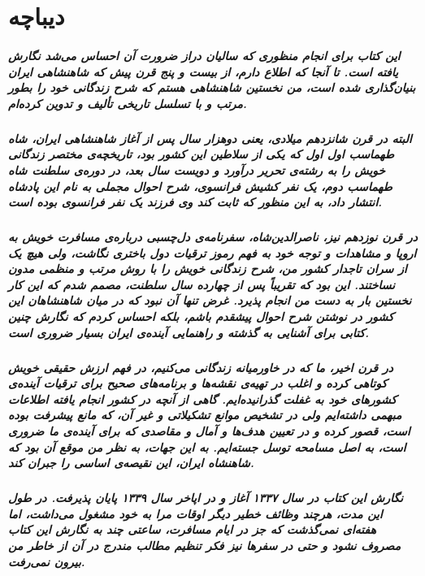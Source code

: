 \chapter{دیباچه}
\paragraph{
این کتاب برای انجام منظوری که سالیان دراز ضرورت آن احساس می‌شد نگارش یافته است. تا آنجا که اطلاع دارم، از بیست و پنج قرن پیش که شاهنشاهی ایران بنیان‌گذاری شده است، من نخستین شاهنشاهی هستم که شرح زندگانی خود را بطور مرتب و با تسلسل تاریخی تألیف و تدوین کرده‌ام.
}
\paragraph{
البته در قرن شانزدهم میلادی، یعنی دوهزار سال پس از آغاز شاهنشاهی ایران، \gls{شاه طهماسب اول} اول که یکی از سلاطین این کشور بود، تاریخچه‌‌ی مختصر زندگانی خویش را به رشته‌ی تحریر درآورد و دویست سال بعد، در دوره‌ی سلطنت \gls{شاه طهماسب دوم}، یک نفر کشیش فرانسوی، شرح احوال مجملی به نام این پادشاه انتشار داد، به این منظور که ثابت کند وی فرزند یک نفر فرانسوی بوده است. 
}
\paragraph{
در قرن نوزدهم نیز، \gls{ناصرالدین‌شاه}، سفرنامه‌ی دل‌چسبی درباره‌ی مسافرت خویش به اروپا و مشاهدات و توجه خود به فهم رموز ترقیات دول باختری نگاشت، ولی هیچ یک از سران تاجدار کشور من، شرح زندگانی خویش را با روش مرتب و منظمی مدون نساختند. این بود که تقریباً پس از چهارده سال سلطنت، مصمم شدم که این کار نخستین بار به دست من انجام پذیرد. 
غرض تنها آن نبود که در میان شاهنشاهان این کشور در نوشتن شرح احوال پیشقدم باشم، بلکه احساس کردم که نگارش چنین کتابی برای آشنایی به گذشته و راهنمایی آینده‌ی ایران بسیار ضروری است.
}
\paragraph{
در قرن اخیر، ما که در خاورمیانه زندگانی می‌کنیم، در فهم ارزش حقیقی خویش کوتاهی کرده و اغلب در تهیه‌ی نقشه‌ها و برنامه‌های صحیح برای ترقیات آینده‌ی کشورهای خود به غفلت گذرانیده‌ایم. گاهی از آنچه در کشور انجام یافته اطلاعات مبهمی داشته‌ایم ولی در تشخیص موانع تشکیلاتی و غیر آن، که مانع پیشرفت بوده است، قصور کرده و در تعیین هدف‌ها و آمال و مقاصدی که برای آینده‌ی ما ضروری است، به اصل مسامحه توسل جسته‌ایم. به این جهات، به نظر من موقع آن بود که شاهنشاه ایران، این نقیصه‌ی اساسی را جبران کند. 
}
\paragraph{
نگارش این کتاب در سال ۱۳۳۷ آغاز و در اپاخر سال ۱۳۳۹ پایان پذیرفت. در طول این مدت، هرچند وظائف خطیر دیگر اوقات مرا به خود مشغول می‌داشت، اما هفته‌ای نمی‌گذشت که جز در ایام مسافرت، ساعتی چند به نگارش این کتاب مصروف نشود و حتی در سفرها نیز فکر تنظیم مطالب مندرج در آن از خاطر من بیرون نمی‌رفت. 
}
